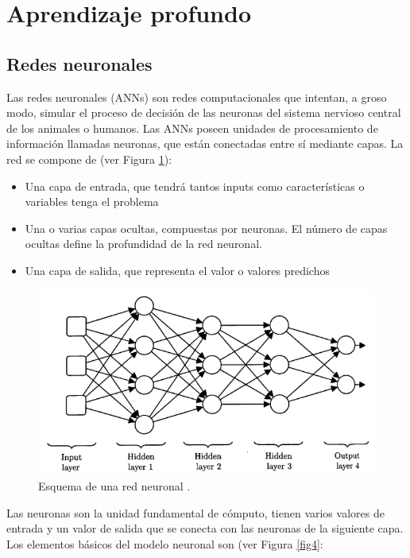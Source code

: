 \section{Aprendizaje profundo}

\subsection{Redes neuronales}
Las redes neuronales (ANNs) \cite{24, 25, 27} son redes computacionales que intentan, a groso modo, simular el proceso de decisión de las neuronas del sistema nervioso central de los animales o humanos. Las ANNs poseen unidades de procesamiento de información llamadas neuronas, que están conectadas entre sí mediante capas. La red se compone de (ver Figura \ref{fig3}):
\begin{itemize}
	\item Una capa de entrada, que tendrá tantos inputs como características o variables tenga el problema
	\item Una o varias capas ocultas, compuestas por neuronas. El número de capas ocultas define la profundidad de la red neuronal.
	\item Una capa de salida, que representa el valor o valores predichos
\end{itemize} 

\begin{figure}[h]
	\centering
	\includegraphics[scale=0.5]{imagenes/cap2/neural-network.png}
	\caption{Esquema de una red neuronal \cite{26}.}
	\label{fig3}
\end{figure}

Las neuronas son la unidad fundamental de cómputo, tienen varios valores de entrada y un valor de salida que se conecta con las neuronas de la siguiente capa. Los elementos básicos del modelo neuronal son (ver Figura \ref{fig4}:

